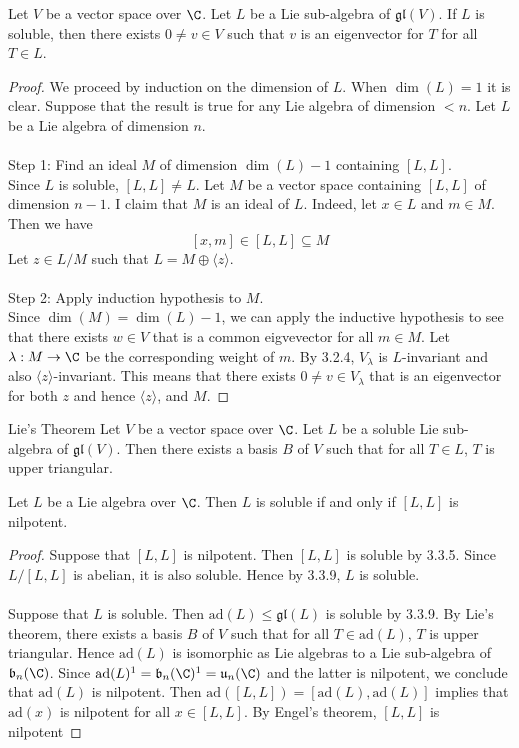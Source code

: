 \documentclass[a4paper]{article}
\begin{document}
\begin{prp}{}{} Let $V$ be a vector space over $\C$. Let $L$ be a Lie sub-algebra of $\mathfrak{gl}(V)$. If $L$ is soluble, then there exists $0\neq v\in V$ such that $v$ is an eigenvector for $T$ for all $T\in L$. \tcbline
\begin{proof}
We proceed by induction on the dimension of $L$. When $\dim(L)=1$ it is clear. Suppose that the result is true for any Lie algebra of dimension $<n$. Let $L$ be a Lie algebra of dimension $n$. \\~\\

Step 1: Find an ideal $M$ of dimension $\dim(L)-1$ containing $[L,L]$. \\
Since $L$ is soluble, $[L,L]\neq L$. Let $M$ be a vector space containing $[L,L]$ of dimension $n-1$. I claim that $M$ is an ideal of $L$. Indeed, let $x\in L$ and $m\in M$. Then we have $$[x,m]\in [L,L]\subseteq M$$ Let $z\in L/M$ such that $L=M\oplus\langle z\rangle$. \\~\\

Step 2: Apply induction hypothesis to $M$. \\
Since $\dim(M)=\dim(L)-1$, we can apply the inductive hypothesis to see that there exists $w\in V$ that is a common eigvevector for all $m\in M$. Let $\lambda:M\to\C$ be the corresponding weight of $m$. By 3.2.4, $V_\lambda$ is $L$-invariant and also $\langle z\rangle$-invariant. This means that there exists $0\neq v\in V_\lambda$ that is an eigenvector for both $z$ and hence $\langle z\rangle$, and $M$. 
\end{proof}
\end{prp}

\begin{thm}{Lie's Theorem}{} Let $V$ be a vector space over $\C$. Let $L$ be a soluble Lie sub-algebra of $\mathfrak{gl}(V)$. Then there exists a basis $B$ of $V$ such that for all $T\in L$, $T$ is upper triangular. 
\end{thm}

\begin{prp}{}{} Let $L$ be a Lie algebra over $\C$. Then $L$ is soluble if and only if $[L,L]$ is nilpotent. \tcbline
\begin{proof}
Suppose that $[L,L]$ is nilpotent. Then $[L,L]$ is soluble by 3.3.5. Since $L/[L,L]$ is abelian, it is also soluble. Hence by 3.3.9, $L$ is soluble. \\~\\

Suppose that $L$ is soluble. Then $\text{ad}(L)\leq\mathfrak{gl}(L)$ is soluble by 3.3.9. By Lie's theorem, there exists a basis $B$ of $V$ such that for all $T\in\text{ad}(L)$, $T$ is upper triangular. Hence $\text{ad}(L)$ is isomorphic as Lie algebras to a Lie sub-algebra of $\mathfrak{b}_n(\C)$. Since $\text{ad}(L)^1=\mathfrak{b}_n(\C)^1=\mathfrak{u}_n(\C)$ and the latter is nilpotent, we conclude that $\text{ad}(L)$ is nilpotent. Then $\text{ad}([L,L])=[\text{ad}(L),\text{ad}(L)]$ implies that $\text{ad}(x)$ is nilpotent for all $x\in [L,L]$. By Engel's theorem, $[L,L]$ is nilpotent
\end{proof}
\end{prp}
\end{document}
